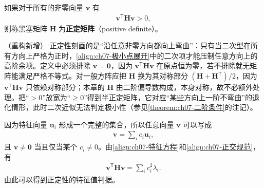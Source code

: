 \documentclass[../../main.tex]{subfiles}
\begin{document}
\begin{definition}[正定矩阵]\label{definition:ch07-正定矩阵}
如果对于所有的非零向量 $\mathbf{v}$ 有
\begin{align}
\mathbf{v}^{\mathsf T}\mathbf{H}\mathbf{v} > 0,
\label{align:ch07-正定二次型}
\end{align}
则称黑塞矩阵 $\mathbf{H}$ 为\textbf{正定矩阵}（positive definite）。
\end{definition}

\begin{remark}（重构新增）
正定性刻画的是“沿任意非零方向都向上弯曲”：只有当二次型在所有方向上严格为正时，\eqref{align:ch07-极小点展开}中的二次项才能压制任意方向上的高阶余项。定义中必须排除 $\mathbf{v}=\mathbf{0}$，因为 $\mathbf{v}^{\mathsf T}\mathbf{H}\mathbf{v}$ 在原点恒为零，若不排除就无矩阵能满足严格不等式。对一般方阵应把 $\mathbf{H}$ 换为其对称部分 $(\mathbf{H}+\mathbf{H}^{\mathsf T})/2$，因为 $\mathbf{v}^{\mathsf T}\mathbf{H}\mathbf{v}$ 只依赖对称部分；本章的 $\mathbf{H}$ 由二阶偏导数构成，本身对称，故不必额外处理。把“$>0$”放宽为“$\geqslant0$”得到半正定矩阵，它对应“某些方向上一阶不弯曲”的退化情形，此时二次近似无法判定极小性（参见\cref{theorem:ch07-二阶条件}的注记）。
\end{remark}

因为特征向量 $\mathbf{u}_i$ 形成一个完整的集合，所以任意向量 $\mathbf{v}$ 可以写成
\begin{align}
\mathbf{v} = \sum_i c_i\mathbf{u}_i,
\label{align:ch07-向量展开}
\end{align}
且 $\mathbf{v}\neq\mathbf{0}$ 当且仅当某个 $c_i\neq0$。由\eqref{align:ch07-特征方程}和\eqref{align:ch07-正交规范}，有
\begin{align}
\mathbf{v}^{\mathsf T}\mathbf{H}\mathbf{v} = \sum_i c_i^{2}\lambda_i.
\label{align:ch07-正定二次型展开}
\end{align}
由此可以得到正定性的特征值判据。
\end{document}
